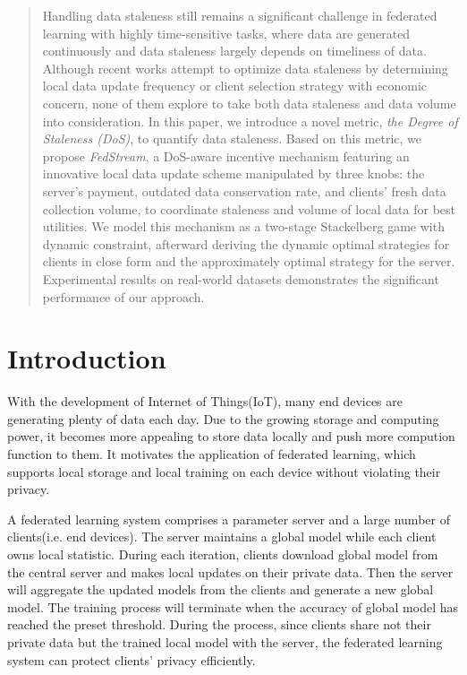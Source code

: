 \documentclass{article}
\theoremstyle{plain}
\theoremstyle{definition}
\theoremstyle{remark}
\begin{document}
\printAffiliationsAndNotice{\icmlEqualContribution} %

\begin{abstract}
Handling data staleness still remains a significant challenge in federated learning with highly time-sensitive tasks, where data are generated continuously and data staleness largely depends on timeliness of data.
Although recent works attempt to optimize data staleness by determining local data update frequency or client selection strategy with economic concern, none of them explore to take both data staleness and data volume into consideration.
In this paper, we introduce a novel metric, \textit{the Degree of Staleness (DoS)}, to quantify data staleness.
Based on this metric, we propose \textit{FedStream}, a DoS-aware incentive mechanism featuring an innovative local data update scheme manipulated by three knobs: the server's payment, outdated data conservation rate, and clients' fresh data collection volume, to coordinate staleness and volume of local data for best utilities.
We model this mechanism as a two-stage Stackelberg game with dynamic constraint, afterward deriving the dynamic optimal strategies for clients in close form and the approximately optimal strategy for the server.
Experimental results on real-world datasets demonstrates the significant performance of our approach.

\end{abstract}

\section{Introduction}
\label{Introduction}
With the development of Internet of Things(IoT), many end devices are generating plenty of data each day.
Due to the growing storage and computing power, it becomes more appealing to store data locally and push more compution function to them.
It motivates the application of federated learning, which supports local storage and local training on each device without violating their privacy.

A federated learning system comprises a parameter server and a large number of clients(i.e. end devices).
The server maintains a global model while each client owns local statistic.
During each iteration, clients download global model from the central server and makes local updates on their private data. Then the server will aggregate the updated models from the clients and generate a new global model.
The training process will terminate when the accuracy of global model has reached the preset threshold.
During the process, since clients share not their private data but the trained local model with the server, the federated learning system can protect clients' privacy efficiently.
\end{document}
